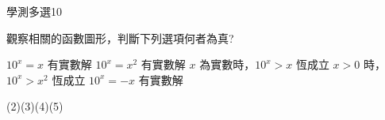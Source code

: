     \begin{QUESTION}
        \begin{ExamInfo}{91}{學測}{多選}{10}
        \end{ExamInfo}
        \begin{ExamAnsRateInfo}{20}{40}{11}{9}
        \end{ExamAnsRateInfo}
        \begin{QBODY}
            觀察相關的函數圖形，判斷下列選項何者為真?
            \begin{QOPS}
                \QOP $10^x=x$ 有實數解 
                \QOP $10^x=x^2$ 有實數解 
                \QOP $x$ 為實數時，$10^x>x$ 恆成立 
                \QOP $x>0$ 時，$10^x>x^2$ 恆成立 
                \QOP $10^x= -x$ 有實數解
            \end{QOPS}
        \end{QBODY}
        \begin{QFROMS}
        \end{QFROMS}
        \begin{QTAGS}\end{QTAGS}
        \begin{QANS}
            (2)(3)(4)(5)
        \end{QANS}
        \begin{QSOLLIST}
        \end{QSOLLIST}
        \begin{QEMPTYSPACE}
        \end{QEMPTYSPACE}
    \end{QUESTION}

